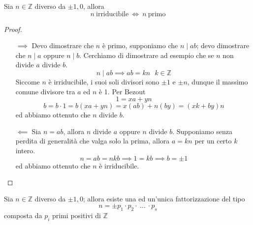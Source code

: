 \begin{teorema}
	Sia $n \in \mathbb{Z}$ diverso da $\pm 1,0$, allora
	\begin{equation*}
	n \ \text{irriducibile} \ \iff \ n \ \text{primo}
	\end{equation*}
\end{teorema}
\begin{proof}\
	\begin{itemize}
		\item[$\implies$] Devo dimostrare che $n$ è primo, supponiamo che $n\mid ab$; devo dimostrare che $n\mid a$ oppure $n\mid b$. Cerchiamo di dimostrare ad esempio che se $n$ non divide $a$ divide $b$.
		\begin{equation*}
		n\mid ab \implies ab=kn \ \ \ k \in \mathbb{Z}
		\end{equation*}
		Siccome $n$ è irriducibile, i suoi soli divisori sono $\pm 1$ e $\pm n$, dunque il massimo comune divisore tra $a$ ed $n$ è 1. Per Bezout 
		\begin{equation*}
		1=xa+yn
		\end{equation*}
		\begin{equation*}
		b=b\cdot1=b(xa+yn)=x(ab)+n(by)=(xk+by)n
		\end{equation*}
		ed abbiamo ottenuto che $n$ divide $b$.
		\item[$\impliedby$] Sia $n=ab$, allora $n$ divide $a$ oppure $n$ divide $b$. Supponiamo senza perdita di generalità che valga solo la prima, allora $a=kn$ per un certo $k$ intero.
		\begin{equation*}
		n = ab = nkb \implies 1 = kb \implies b = \pm 1
		\end{equation*}
		ed abbiamo ottenuto che $n$ è irriducibile.
	\end{itemize}
\end{proof}
\begin{teorema} 
	Sia $n \in \mathbb{Z}$ diverso da $\pm 1,0$; allora esiste una ed un'unica fattorizzazione del tipo
	\begin{equation*}
	n = \pm p_1\cdot p_2 \cdot \ \dots\ \cdot p_s
	\end{equation*}
	composta da $p_i$ primi positivi di $\mathbb{Z}$
\end{teorema}
